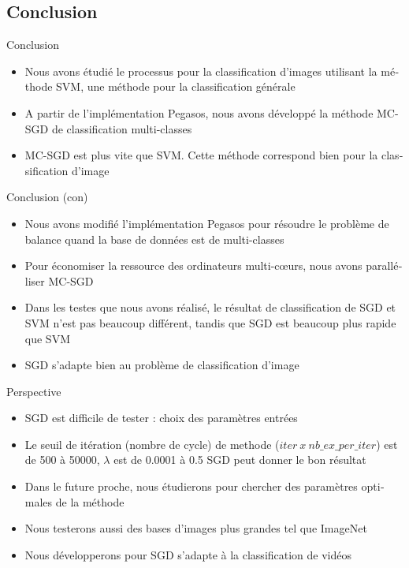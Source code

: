 \documentclass[11pt]{beamer}
\begin{document}
\begin{otherlanguage}{french}
\section{Conclusion}
\begin{frame}{Conclusion}
\begin{itemize}
\item Nous avons étudié le processus pour la classification d'images utilisant la méthode SVM, une méthode pour la classification générale
\item A partir de l'implémentation Pegasos, nous avons développé la méthode MC-SGD de classification multi-classes
\item MC-SGD est plus vite que SVM. Cette méthode correspond bien pour la classification d'image
\end{itemize}
\end{frame}

\begin{frame}{Conclusion (con)}
\begin{itemize}
\item Nous avons modifié l'implémentation Pegasos pour résoudre le problème de balance quand la base de données est de multi-classes
\item Pour économiser la ressource des ordinateurs multi-cœurs, nous avons paralléliser MC-SGD
\item Dans les testes que nous avons réalisé, le résultat de classification de SGD et SVM n'est pas beaucoup différent, tandis que SGD est beaucoup plus rapide que SVM
\item SGD s'adapte bien au problème de classification d'image
\end{itemize}
\end{frame}


\begin{frame}{Perspective}
\begin{itemize}
\item SGD est difficile de tester : choix des paramètres entrées
\item Le seuil de itération (nombre de cycle) de methode ($iter\ x\ nb\_ex\_per\_iter$) est de 500 à 50000, $\lambda$ est de 0.0001 à 0.5 SGD peut donner le bon résultat
\item Dans le future proche, nous étudierons pour chercher des paramètres optimales de la méthode
\item Nous testerons aussi des bases d'images plus grandes tel que ImageNet
\item Nous développerons pour SGD s'adapte à la classification de vidéos
\end{itemize}
\end{frame}



\end{otherlanguage}
\end{document}
